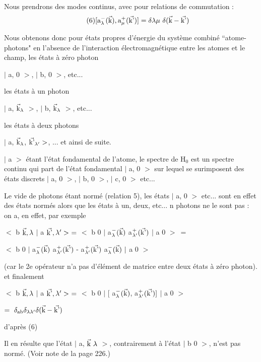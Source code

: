 Nous prendrons des modes continus, avec pour relations de commutation :
\[
\tag{6}[\text{a}_\lambda^-(\vec{\text{k}}),\text{a}_\mu^+(\vec{\text{k'}})]=
\delta\lambda\mu\ \delta(\vec{\text{k}}-\vec{\text{k'}})
\]

Nous obtenons donc pour états propres d'énergie du système combiné
“atome-photons" en l'absence de l'interaction électromagnétique entre les atomes
et le champ, les états à zéro photon
\begin{center}
$|$ a, 0 $>$, $|$ b, 0 $>$, etc...
\end{center}
les états à un photon
\begin{center}
$|$ a, $\vec{\text{k}}_\lambda$ $>$, $|$ b, $\vec{\text{k}}_\lambda$ $>$, etc...
\end{center}
les états à deux photons
\begin{center}
$|$ a, $\vec{\text{k}}_\lambda$,  $\vec{\text{k'}}_{\lambda'}>$, ... et ainsi de suite.
\end{center}
$|$ a $>$ étant l'état fondamental de l'atome, le spectre de H$_0$ est un spectre
continu qui part de l'état fondamental $|$ a, 0 $>$ sur lequel se surimposent
des états discrets $|$ a, 0 $>$, $|$ b, 0 $>$, $|$ c, 0 $>$ etc...

Le vide de photons étant normé (relation 5), les états $|$ a, 0 $>$
etc... sont en effet des états normés alors que les états à un, deux, etc...
n photons ne le sont pas : on a, en effet, par exemple
\begin{center}
$<$ b $\vec{\text{k}}, \lambda$ $|$ a $\vec{\text{k'}}, \lambda' >\ =$
$<$ b 0 $|$ a$^-_\lambda(\vec{\text{k}})$ a$^+_{\lambda'}(\vec{\text{k'}})$ $|$ a 0 $>\ =$

$<$ b 0 $|$ a$^-_\lambda(\vec{\text{k}})$ a$^+_{\lambda'}(\vec{\text{k'}})$ - 
a$^+_{\lambda'}(\vec{\text{k'}})$ a$^-_\lambda(\vec{\text{k}}) \ |$ a 0 $>$
\end{center}
(car le 2e opérateur n'a pas d'élément de matrice entre deux états à zéro
photon).
et finalement
\begin{center}
$<$ b $\vec{\text{k}}, \lambda$ $|$ a $\vec{\text{k'}}, \lambda' >\ =$
$<$ b 0 $|$ $\lbrack$ a$^-_\lambda(\vec{\text{k}})$, a$^+_{\lambda'}(\vec{\text{k'}})\rbrack$ $|$ a 0 $>$

$ =\ \delta_\mt{ab}\delta_{\lambda\lambda'}\delta(\vec{\mt{k}}-\vec{\mt{k'}})$
\end{center}
d'après (6)

Il en résulte que l'état $|$ a, $\vec{\text{k}}\ \lambda$ $>$, contrairement à l'état
$|$ b 0 $>$, n'est pas normé. (Voir note de la page 226.)


